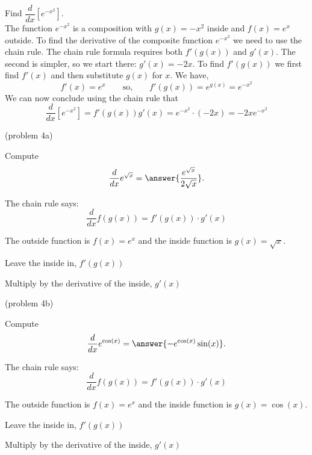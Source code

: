 \documentclass[handout]{ximera}
\begin{document}
\begin{example}[example 4]
Find $\dfrac{d}{dx}\left[e^{-x^2}\right]$.\\
The function $e^{-x^2}$ is a composition with $g(x) = -x^2$ inside and $f(x) = e^x$ outside.
To find the derivative of the composite function $e^{-x^2}$ we need to use the chain rule.
The chain rule formula requires both $f'(g(x))$ and $g'(x)$. The second is simpler, so we start there: $g'(x) = -2x$.
To find $f'(g(x))$ we first find $f'(x)$ and then substitute $g(x)$ for $x$. 
We have, 
\[
f'(x) = e^x \qquad \mbox{so,} \qquad f'(g(x)) = e^{g(x)} = e^{-x^2}
\]
We can now conclude using the chain rule that
\[
\frac{d}{dx}\left[e^{-x^2}\right] = f'(g(x))g'(x) = e^{-x^2} \cdot (-2x) = -2xe^{-x^2}
\]
\end{example}

\begin{problem}(problem 4a)
  
Compute
  \[
  \frac{d}{dx} e^{\sqrt x} = \answer{\frac{e^{\sqrt x}}{2\sqrt x}}.
  \]
  
    \begin{hint}
      The chain rule says:
      \[
      \frac{d}{dx} f(g(x)) = f'(g(x))\cdot g'(x)
      \]
    \end{hint}
    \begin{hint}
      The outside function is $f(x) = e^x$ and the inside
      function is $g(x) = \sqrt{x}$.
    \end{hint}
    \begin{hint}
		  Leave the inside in, $f'(g(x))$
		\end{hint}
		\begin{hint}
		  Multiply by the derivative of the inside, $g'(x)$
		\end{hint}
    
\end{problem}

\begin{problem}(problem 4b)
  
Compute
  \[
  \frac{d}{dx} e^{\cos(x)} = \answer{-e^{\cos(x)}\sin(x)}.
  \]
  
    \begin{hint}
      The chain rule says:
      \[
      \frac{d}{dx} f(g(x)) = f'(g(x))\cdot g'(x)
      \]
    \end{hint}
    \begin{hint}
      The outside function is $f(x) = e^x$ and the inside
      function is $g(x) = \cos(x)$.
    \end{hint}
    \begin{hint}
		  Leave the inside in, $f'(g(x))$
		\end{hint}
		\begin{hint}
		  Multiply by the derivative of the inside, $g'(x)$
		\end{hint}
    
\end{problem}
\end{document}
